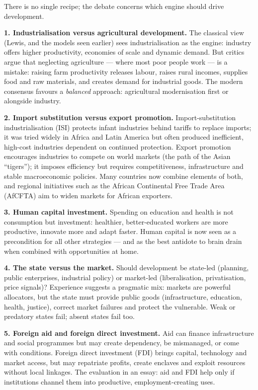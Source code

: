 \documentclass[11pt]{article}
\newcommand{\cle}[1]{{\popxbold\color{popdark}#1}}
\newcounter{popsec}
\newcounter{popsub}
\newcommand{\courssub}[1]{%
  \stepcounter{popsub}%
  \par\vspace{9pt}\noindent{\popxbold\fontsize{11.5}{13}\selectfont\color{popink}{\color{poporange}\thepopsec.\thepopsub}\hspace{6pt}#1}\par\nopagebreak\vspace{4pt}
}
\begin{document}
\courssub{Strategies of Development}

There is no single recipe; the debate concerns which engine should drive development.

\textbf{1. Industrialisation versus agricultural development.} The classical view (Lewis, and the models seen earlier) sees \cle{industrialisation} as the engine: industry offers higher productivity, economies of scale and dynamic demand. But critics argue that neglecting \cle{agriculture} — where most poor people work — is a mistake: raising farm productivity releases labour, raises rural incomes, supplies food and raw materials, and creates demand for industrial goods. The modern consensus favours a \emph{balanced} approach: agricultural modernisation first or alongside industry.

\textbf{2. Import substitution versus export promotion.} \cle{Import-substitution industrialisation (ISI)} protects infant industries behind tariffs to replace imports; it was tried widely in Africa and Latin America but often produced inefficient, high-cost industries dependent on continued protection. \cle{Export promotion} encourages industries to compete on world markets (the path of the Asian ``tigers''); it imposes efficiency but requires competitiveness, infrastructure and stable macroeconomic policies. Many countries now combine elements of both, and regional initiatives such as the African Continental Free Trade Area (AfCFTA) aim to widen markets for African exporters.

\textbf{3. Human capital investment.} Spending on \cle{education and health} is not consumption but investment: healthier, better-educated workers are more productive, innovate more and adapt faster. Human capital is now seen as a precondition for all other strategies — and as the best antidote to brain drain when combined with opportunities at home.

\textbf{4. The state versus the market.} Should development be state-led (planning, public enterprises, industrial policy) or market-led (liberalisation, privatisation, price signals)? Experience suggests a pragmatic mix: markets are powerful allocators, but the state must provide public goods (infrastructure, education, health, justice), correct market failures and protect the vulnerable. Weak or predatory states fail; absent states fail too.

\textbf{5. Foreign aid and foreign direct investment.} \cle{Aid} can finance infrastructure and social programmes but may create dependency, be mismanaged, or come with conditions. \cle{Foreign direct investment (FDI)} brings capital, technology and market access, but may repatriate profits, create enclaves and exploit resources without local linkages. The evaluation in an essay: aid and FDI help only if institutions channel them into productive, employment-creating uses.
\end{document}
